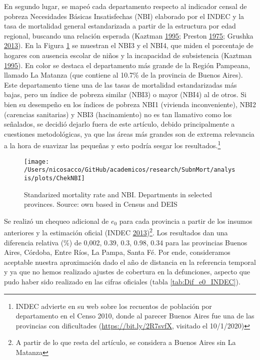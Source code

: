 \documentclass[12pt,]{article}
\begin{document}
En segundo lugar, se mapeó cada departamento respecto al indicador
censal de pobreza Necesidades Básicas Insatisfechas (NBI) elaborado por
el INDEC y la tasa de mortalidad general estandarizada a partir de la
estructura por edad regional, buscando una relación esperada (Kaztman
\protect\hyperlink{ref-Kaztman1995}{1995}; Preston
\protect\hyperlink{ref-Preston1975}{1975}; Grushka
\protect\hyperlink{ref-Grushka2013}{2013}). En la Figura \ref{fig:NBI}
se muestran el NBI3 y el NBI4, que miden el porcentaje de hogares con
ausencia escolar de niños y la incapacidad de subsistencia (Kaztman
\protect\hyperlink{ref-Kaztman1995}{1995}). En color se destaca el
departamento más grande de la Región Pampeana, llamado La Matanza (que
contiene al 10.7\% de la provincia de Buenos Aires). Este departamento
tiene una de las tasas de mortalidad estandarizadas más bajas, pero un
índice de pobreza similar (NBI3) o mayor (NBI4) al de otros. Si bien su
desempeño en los índices de pobreza NBI1 (vivienda inconveniente), NBI2
(carencias sanitarias) y NBI3 (hacinamiento) no es tan llamativo como
los señalados, se decidió dejarlo fuera de este artículo, debido
principalmente a cuestiones metodológicas, ya que las áreas más grandes
son de extrema relevancia a la hora de suavizar las pequeñas y esto
podría sesgar los resultados.\footnote{INDEC advierte en su web sobre
  los recuentos de población por departamento en el Censo 2010, donde al
  parecer Buenos Aires fue una de las provincias con dificultades
  (\url{https://bit.ly/2R7svfX}, visitado el 10/1/2020)}

\begin{figure}

{\centering \texttt{[image: /Users/nicosacco/GitHub/academicos/research/SubnMort/analysis/plots/ChekNBI]} 

}

\caption{Standarized mortality rate and NBI. Departments in selected provinces. Source: own based in Census and DEIS}\label{fig:NBI}
\end{figure}

Se realizó un chequeo adicional de \(e_0\) para cada provincia a partir
de los insumos anteriores y la estimación oficial (INDEC
\protect\hyperlink{ref-INDEC2013}{2013})\footnote{A partir de lo que
  resta del artículo, se considera a Buenos Aires sin La Matanza}. Los
resultados dan una diferencia relativa (\%) de 0,002, 0.39, 0.3, 0.98,
0.34 para las provincias Buenos Aires, Córdoba, Entre Ríos, La Pampa,
Santa Fé. Por ende, consideramos aceptable nuestra aproximación dado el
año de distancia en la referencia temporal y ya que no hemos realizado
ajustes de cobertura en la defunciones, aspecto que pudo haber sido
realizado en las cifras oficiales (tabla \ref{tab:Dif_e0_INDEC}).
\end{document}

